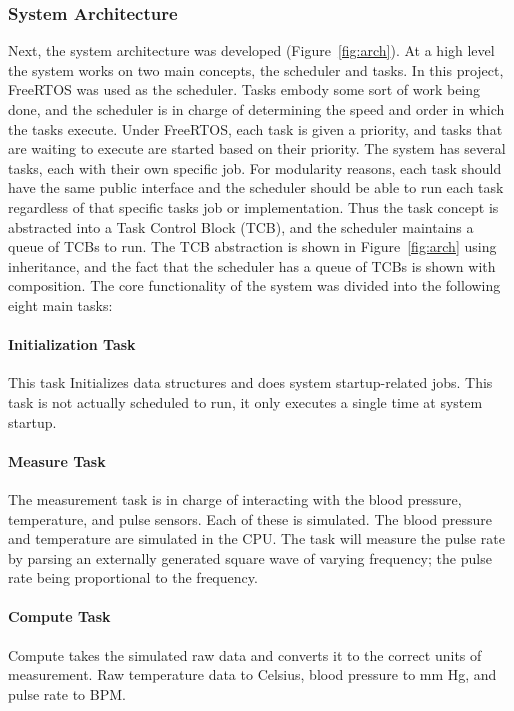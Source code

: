 \documentclass[12pt]{article} %
\begin{document}
    \subsubsection{System Architecture} Next, the system architecture was
    developed (Figure~\ref{fig:arch}). At a high level the system works on two
    main concepts, the scheduler and tasks. In this project, FreeRTOS was used
    as the scheduler.  Tasks embody some sort of work being done, and the
    scheduler is in charge of determining the speed and order in which the
    tasks execute.  Under FreeRTOS, each task is given a priority, and tasks
    that are waiting to execute are started based on their priority.  The
    system has several tasks, each with their own specific job. For modularity
    reasons, each task should have the same public interface and the scheduler
    should be able to run each task regardless of that specific tasks job or
    implementation. Thus the task concept is abstracted into a Task Control
    Block (TCB), and the scheduler maintains a queue of TCBs to run. The TCB
    abstraction is shown in Figure~\ref{fig:arch} using inheritance, and the
    fact that the scheduler has a queue of TCBs is shown with composition. The
    core functionality of the system was divided into the following eight main
    tasks:

    \paragraph{Initialization Task} This task Initializes data structures and does
    system startup-related jobs. This task is not actually scheduled to run, it
    only executes a single time at system startup.

    \paragraph{Measure Task} The measurement task is in charge of interacting with
    the blood pressure, temperature, and pulse sensors. Each of these is
    simulated. The blood pressure and temperature are simulated in the CPU. The
    task will measure the pulse rate by parsing an externally generated square wave
    of varying frequency; the pulse rate being proportional to the frequency.

    \paragraph{Compute Task} Compute takes the simulated raw data and converts it to the
    correct units of measurement. Raw temperature data to Celsius, blood pressure
    to mm Hg, and pulse rate to BPM.
\end{document}
